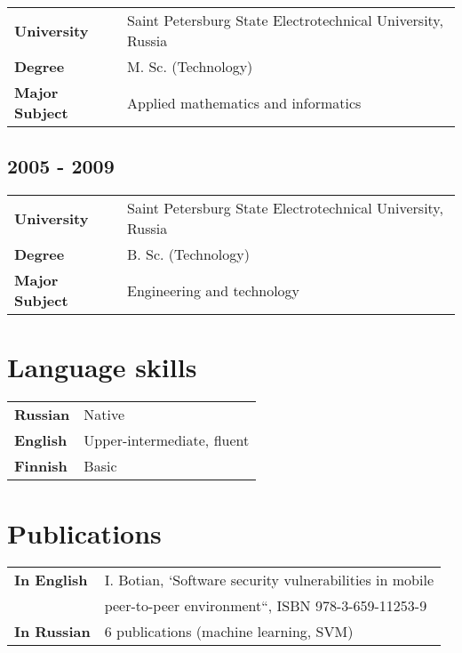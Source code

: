 \documentclass[a4paper,12pt]{article}
\begin{document}
\begin{tabular}{ll}
    \textbf{University} & Saint Petersburg State Electrotechnical University, Russia \\
    \textbf{Degree} & M. Sc. (Technology) \\
    \textbf{Major Subject} & Applied mathematics and informatics \\
\end{tabular}

\subsection*{2005 - 2009}

\begin{tabular}{ll}
    \textbf{University} & Saint Petersburg State Electrotechnical University, Russia \\
    \textbf{Degree} & B. Sc. (Technology) \\
    \textbf{Major Subject} & Engineering and technology \\
\end{tabular}


\section*{Language skills}

\begin{tabular}{ll}
    \textbf{Russian} & Native \\
    \textbf{English} & Upper-intermediate, fluent \\
    \textbf{Finnish} & Basic \\
\end{tabular}


\section*{Publications}

\begin{tabular}{ll}
    \textbf{In English} & I. Botian, `Software security vulnerabilities in mobile \\
        & peer-to-peer environment``, ISBN 978-3-659-11253-9 \\
    \textbf{In Russian} & 6 publications (machine learning, SVM) \\
\end{tabular}
\end{document}
